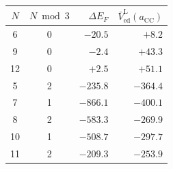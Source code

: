 \begin{tabular}{c c r r}
    \hline\hline
    $N$ & $N \bmod 3$ & $\Delta E_F$ & $\bar V^\text{L}_\text{ed}(a_\text{CC})$ \\
    \hline
    6  & 0 & $-20.5$  & $+8.2$ \\
    9  & 0 & $-2.4$   & $+43.3$ \\
    12 & 0 & $+2.5$   & $+51.1$ \\
    \hline
    5  & 2 & $-235.8$ & $-364.4$ \\
    7  & 1 & $-866.1$ & $-400.1$ \\
    8  & 2 & $-583.3$ & $-269.9$ \\
    10 & 1 & $-508.7$ & $-297.7$ \\
    11 & 2 & $-209.3$ & $-253.9$ \\
    \hline\hline
\end{tabular}
